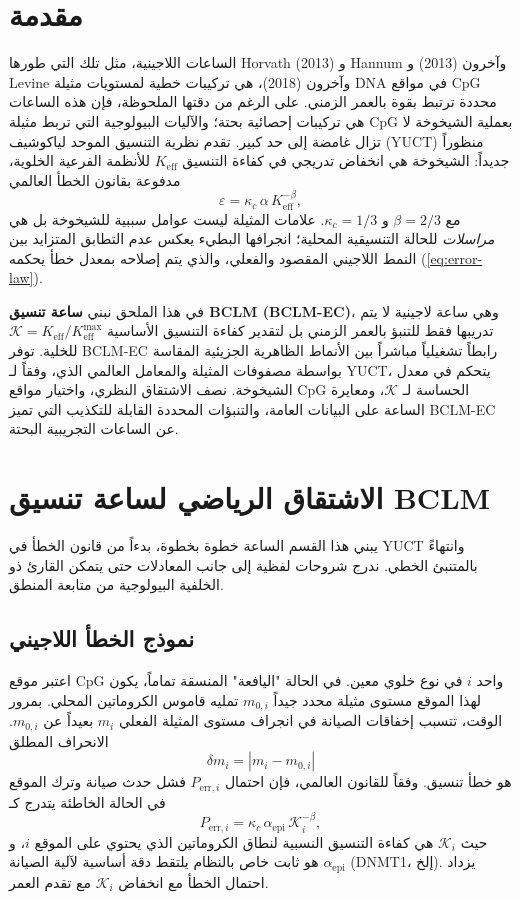 \documentclass[11pt,a4paper]{article}
\newcommand{\REL}{\mathcal{K}}          %
\begin{document}
	\section{مقدمة}
	\label{sec:intro}
	الساعات اللاجينية، مثل تلك التي طورها Horvath (2013) و Hannum وآخرون (2013) و Levine وآخرون (2018)، هي تركيبات خطية لمستويات مثيلة DNA في مواقع CpG محددة ترتبط بقوة بالعمر الزمني.
	على الرغم من دقتها الملحوظة، فإن هذه الساعات هي تركيبات إحصائية بحتة؛ والآليات البيولوجية التي تربط مثيلة CpG بعملية الشيخوخة لا تزال غامضة إلى حد كبير.
	تقدم نظرية التنسيق الموحد لياكوشيف (YUCT) منظوراً جديداً: الشيخوخة هي انخفاض تدريجي في كفاءة التنسيق \(K_{\mathrm{eff}}\) للأنظمة الفرعية الخلوية، مدفوعة بقانون الخطأ العالمي
	\begin{equation}
		\varepsilon = \kappa_c \, \alpha \, K_{\mathrm{eff}}^{-\beta},
		\label{eq:error-law}
	\end{equation}
	مع \(\beta = 2/3\) و \(\kappa_c = 1/3\).
	علامات المثيلة ليست عوامل سببية للشيخوخة بل هي \emph{مراسلات} للحالة التنسيقية المحلية؛ انجرافها البطيء يعكس عدم التطابق المتزايد بين النمط اللاجيني المقصود والفعلي، والذي يتم إصلاحه بمعدل خطأ يحكمه (\ref{eq:error-law}).
	
	في هذا الملحق نبني \textbf{ساعة تنسيق BCLM (BCLM-EC)}، وهي ساعة لاجينية لا يتم تدريبها فقط للتنبؤ بالعمر الزمني بل لتقدير كفاءة التنسيق الأساسية \(\REL = K_{\mathrm{eff}}/K_{\mathrm{eff}}^{\max}\) للخلية.
	توفر BCLM-EC رابطاً تشغيلياً مباشراً بين الأنماط الظاهرية الجزيئية المقاسة بواسطة مصفوفات المثيلة والمعامل العالمي الذي، وفقاً لـ YUCT، يتحكم في معدل الشيخوخة.
	نصف الاشتقاق النظري، واختيار مواقع CpG الحساسة لـ \(\REL\)، ومعايرة الساعة على البيانات العامة، والتنبؤات المحددة القابلة للتكذيب التي تميز BCLM-EC عن الساعات التجريبية البحتة.
	
	\section{الاشتقاق الرياضي لساعة تنسيق BCLM}
	\label{sec:math}
	يبني هذا القسم الساعة خطوة بخطوة، بدءاً من قانون الخطأ في YUCT وانتهاءً بالمتنبئ الخطي. ندرج شروحات لفظية إلى جانب المعادلات حتى يتمكن القارئ ذو الخلفية البيولوجية من متابعة المنطق.
	
	\subsection{نموذج الخطأ اللاجيني}
	اعتبر موقع CpG واحد \(i\) في نوع خلوي معين. في الحالة "اليافعة" المنسقة تماماً، يكون لهذا الموقع مستوى مثيلة محدد جيداً \(m_{0,i}\) تمليه قاموس الكروماتين المحلي. بمرور الوقت، تتسبب إخفاقات الصيانة في انجراف مستوى المثيلة الفعلي \(m_i\) بعيداً عن \(m_{0,i}\). الانحراف المطلق
	\[
	\delta m_i = |m_i - m_{0,i}|
	\]
	هو خطأ تنسيق. وفقاً للقانون العالمي، فإن احتمال \(P_{\mathrm{err},i}\) فشل حدث صيانة وترك الموقع في الحالة الخاطئة يتدرج كـ
	\begin{equation}
		P_{\mathrm{err},i} = \kappa_c \, \alpha_{\mathrm{epi}} \, \REL_i^{-\beta},
		\label{eq:perr}
	\end{equation}
	حيث \(\REL_i\) هي كفاءة التنسيق النسبية لنطاق الكروماتين الذي يحتوي على الموقع \(i\)، و \(\alpha_{\mathrm{epi}}\) هو ثابت خاص بالنظام يلتقط دقة أساسية لآلية الصيانة (DNMT1، إلخ). يزداد احتمال الخطأ مع انخفاض \(\REL_i\) مع تقدم العمر.
	
\end{document}
